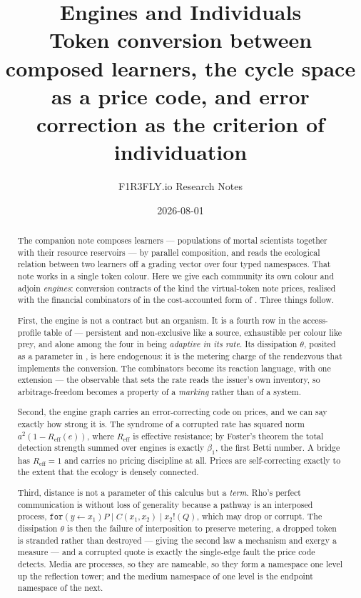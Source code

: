 \documentclass[11pt]{article}
\title{\textbf{Engines and Individuals}\\[4pt]
\large Token conversion between composed learners, the cycle space as a
price code, and error correction as the criterion of individuation}
\author{F1R3FLY.io Research Notes}
\date{2026-08-01}
\theoremstyle{plain}
\theoremstyle{definition}
\theoremstyle{remark}
\newcommand{\Reff}{R_{\mathrm{eff}}}
\newcommand{\bt}{\beta_1}
\begin{document}
\maketitle

\begin{abstract}
\noindent
The companion note \cite{compose} composes learners --- populations of
mortal scientists together with their resource reservoirs --- by parallel
composition, and reads the ecological relation between two learners off a
grading vector over four typed namespaces. That note works in a single
token colour. Here we give each community its own colour and adjoin
\emph{engines}: conversion contracts of the kind the virtual-token note
\cite{vtok} prices, realised with the financial combinators of
\cite{SPJ2000} in the cost-accounted form of \cite{finrho}. Three things
follow.

First, the engine is not a contract but an organism. It is a fourth row in
the access-profile table of \cite[\S10]{scientist} --- persistent and
non-exclusive like a source, exhaustible per colour like prey, and alone
among the four in being \emph{adaptive in its rate}. Its dissipation
$\theta$, posited as a parameter in \cite{vtok}, is here endogenous: it is
the metering charge of the rendezvous that implements the conversion. The
combinators become its reaction language, with one extension --- the
observable that sets the rate reads the issuer's own inventory, so
arbitrage-freedom becomes a property of a \emph{marking} rather than of a
system.

Second, the engine graph carries an error-correcting code on prices, and we
can say exactly how strong it is. The syndrome of a corrupted rate has
squared norm $a^2(1-\Reff(e))$, where $\Reff$ is effective resistance; by
Foster's theorem the total detection strength summed over engines is
exactly $\bt$, the first Betti number. A bridge has $\Reff = 1$ and
carries no pricing discipline at all. Prices are self-correcting exactly to
the extent that the ecology is densely connected.

Third, distance is not a parameter of this calculus but a \emph{term}.
Rho's perfect communication is without loss of generality because a
pathway is an interposed process, $\texttt{for}(y \leftarrow x_1)P \mid
C(x_1,x_2) \mid x_2!(Q)$, which may drop or corrupt. The dissipation
$\theta$ is then the failure of interposition to preserve metering, a
dropped token is stranded rather than destroyed --- giving the second law
a mechanism and exergy a measure --- and a corrupted quote is exactly the
single-edge fault the price code detects. Media are processes, so they are
nameable, so they form a namespace one level up the reflection tower; and
the medium namespace of one level is the endpoint namespace of the next.


\end{abstract}
\end{document}
